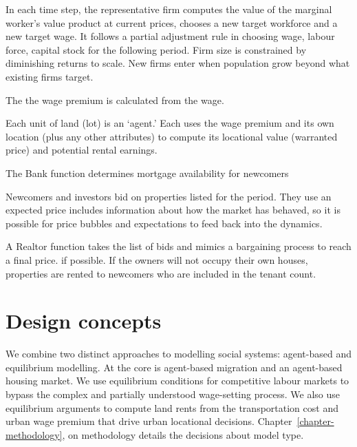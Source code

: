 
In each time step, the representative firm computes the value of the marginal worker's value product at current prices, chooses a new target workforce and a new target wage. It follows a partial adjustment rule in choosing wage, labour force, capital stock for the following period. Firm size is constrained by diminishing returns to scale. New firms enter when population grow beyond what existing firms target. 


The the wage premium is calculated from the wage.

Each unit of land (lot) is an `agent.' Each uses the wage premium and its own location (plus any other attributes) to compute its locational value (warranted price) and potential rental earnings. 

The Bank function determines mortgage availability for newcomers 

Newcomers and investors bid on properties listed for the period. They use an expected price includes information about how the market has behaved, so it is possible for price bubbles and expectations to feed back into the dynamics. 

A Realtor function takes the list of bids and mimics a bargaining process to reach a final price. if possible. If the owners will not occupy their own houses, properties are rented to newcomers who are included in the tenant count.





\section{Design concepts}



We combine two distinct approaches to modelling social systems: agent-based and equilibrium modelling. At the core is  agent-based migration and an agent-based housing market. We use equilibrium conditions for competitive labour markets to bypass the complex and partially understood wage-setting process. We also use equilibrium arguments to compute land rents from the transportation cost and urban wage premium that drive urban locational decisions. Chapter~\ref{chapter-methodology}, on methodology details the decisions about model type.

